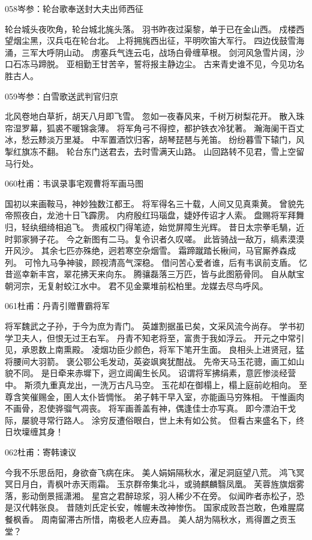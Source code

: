 058岑参：轮台歌奉送封大夫出师西征

轮台城头夜吹角，轮台城北旄头落。
羽书昨夜过渠黎，单于已在金山西。
戍楼西望烟尘黑，汉兵屯在轮台北。
上将拥旄西出征，平明吹笛大军行。
四边伐鼓雪海涌，三军大呼阴山动。
虏塞兵气连云屯，战场白骨缠草根。
剑河风急雪片阔，沙口石冻马蹄脱。
亚相勤王甘苦辛，誓将报主静边尘。
古来青史谁不见，今见功名胜古人。

059岑参：白雪歌送武判官归京

北风卷地白草折，胡天八月即飞雪。
忽如一夜春风来，千树万树梨花开。
散入珠帘湿罗幕，狐裘不暖锦衾薄。
将军角弓不得控，都护铁衣冷犹著。
瀚海阑干百丈冰，愁云黪淡万里凝。
中军置酒饮归客，胡琴琵琶与羌笛。
纷纷暮雪下辕门，风掣红旗冻不翻。
轮台东门送君去，去时雪满天山路。
山回路转不见君，雪上空留马行处。

060杜甫：韦讽录事宅观曹将军画马图

国初以来画鞍马，神妙独数江都王。
将军得名三十载，人间又见真乘黄。
曾貌先帝照夜白，龙池十日飞霹雳。
内府殷红玛瑙盘，婕妤传诏才人索。
盘赐将军拜舞归，轻纨细绮相追飞。
贵戚权门得笔迹，始觉屏障生光辉。
昔日太宗拳毛騧，近时郭家狮子花。
今之新图有二马。复令识者久叹嗟。
此皆骑战一敌万，缟素漠漠开风沙。
其余七匹亦殊绝，迥若寒空杂烟雪。
霜蹄蹴踏长楸间，马官厮养森成列。
可怜九马争神骏，顾视清高气深稳。
借问苦心爱者谁，后有韦讽前支盾。
忆昔巡幸新丰宫，翠花拂天来向东。
腾骧磊落三万匹，皆与此图筋骨同。
自从献宝朝河宗，无复射蛟江水中。
君不见金粟堆前松柏里。龙媒去尽鸟呼风。

061杜甫：丹青引赠曹霸将军

将军魏武之子孙，于今为庶为青门。
英雄割据虽已矣，文采风流今尚存。
学书初学卫夫人，但恨无过王右军。
丹青不知老将至，富贵于我如浮云。
开元之中常引见，承恩数上南熏殿。
凌烟功臣少颜色，将军下笔开生面。
良相头上进贤冠，猛将腰间大羽箭。
褒公鄂公毛发动，英姿飒爽犹酣战。
先帝天马玉花骢，画工如山貌不同。
是日牵来赤墀下，迥立阊阖生长风。
诏谓将军拂绢素，意匠惨淡经营中。
斯须九重真龙出，一洗万古凡马空。
玉花却在御榻上，榻上庭前屹相向。
至尊含笑催赐金，圉人太仆皆惆怅。
弟子韩干早入室，亦能画马穷殊相。
干惟画肉不画骨，忍使骅骝气凋丧。
将军画善盖有神，偶逢佳士亦写真。
即今漂泊干戈际，屡貌寻常行路人。
涂穷反遭俗眼白，世上未有如公贫。
但看古来盛名下，终日坎壈缠其身！

062杜甫：寄韩谏议

今我不乐思岳阳，身欲奋飞病在床。
美人娟娟隔秋水，濯足洞庭望八荒。
鸿飞冥冥日月白，青枫叶赤天雨霜。
玉京群帝集北斗，或骑麒麟翳凤凰。
芙蓉旌旗烟雾落，影动倒景摇潇湘。
星宫之君醉琼浆，羽人稀少不在旁。
似闻昨者赤松子，恐是汉代韩张良。
昔随刘氏定长安，帷幄未改神惨伤。
国家成败吾岂敢，色难腥腐餐枫香。
周南留滞古所惜，南极老人应寿昌。
美人胡为隔秋水，焉得置之贡玉堂？

